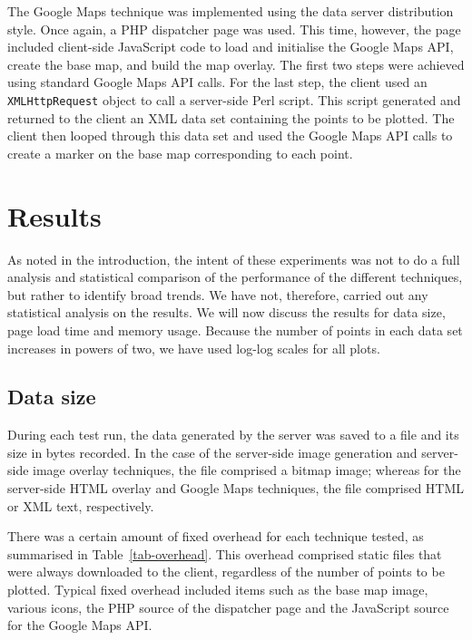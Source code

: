 \documentclass[acmnow]{acmtrans2m}
\begin{document}
The Google Maps technique was implemented using the data server
distribution style. Once again, a PHP dispatcher page was used. This
time, however, the page included client-side JavaScript code to load and
initialise the Google Maps API, create the base map, and build the map
overlay. The first two steps were achieved using standard Google Maps
API calls. For the last step, the client used an \texttt{XMLHttpRequest}
object to call a server-side Perl script. This script generated and
returned to the client an XML data set containing the points to be
plotted. The client then looped through this data set and used the
Google Maps API calls to create a marker on the base map corresponding
to each point.


\section{Results}
\label{sec-results}

As noted in the introduction, the intent of these experiments was not to
do a full analysis and statistical comparison of the performance of the
different techniques, but rather to identify broad trends. We have not,
therefore, carried out any statistical analysis on the results. We will
now discuss the results for data size, page load time and memory usage.
Because the number of points in each data set increases in powers of
two, we have used log-log scales for all plots.


\subsection{Data size}

During each test run, the data generated by the server was saved to a
file and its size in bytes recorded. In the case of the server-side
image generation and server-side image overlay techniques, the file
comprised a bitmap image; whereas for the server-side HTML overlay and
Google Maps techniques, the file comprised HTML or XML text,
respectively.

There was a certain amount of fixed overhead for each technique tested,
as summarised in Table~\ref{tab-overhead}. This overhead comprised
static files that were always downloaded to the client, regardless of
the number of points to be plotted. Typical fixed overhead included
items such as the base map image, various icons, the PHP source of the
dispatcher page and the JavaScript source for the Google Maps API.
\end{document}
